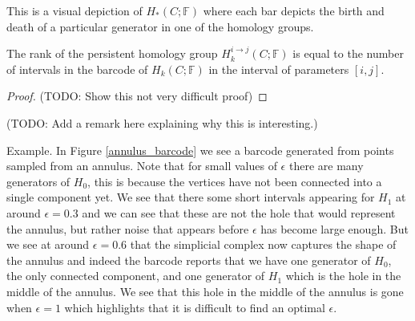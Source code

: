 This is a visual depiction of $H_{*}(C; \mathbb{F})$ where each bar depicts the birth and death of a particular generator in one of the homology groups.

\begin{theorem}
  The rank of the persistent homology group $H^{{i \to j}}_{k}(C;\mathbb{F})$ is equal to the number of intervals in the barcode of $H_{k}(C;\mathbb{F})$ in the interval of parameters $[i,j]$.
  \end{theorem}
  \begin{proof}
  (TODO: Show this not very difficult proof)
  \end{proof}
  (TODO: Add a remark here explaining why this is interesting.)

  Example. In Figure \ref{annulus_barcode} we see a barcode generated from points sampled from an annulus. Note that for small values of $\epsilon$ there are many generators of $H_{0}$, this is because the vertices have not been connected into a single component yet. We see that there some short intervals appearing for $H_{1}$ at around $\epsilon=0.3$ and we can see that these are not the hole that would represent the annulus, but rather noise that appears before $\epsilon$ has become large enough. But we see at around $\epsilon=0.6$ that the simplicial complex now captures the shape of the annulus and indeed the barcode reports that we have one generator of $H_{0}$, the only connected component, and one generator of $H_{1}$ which is the hole in the middle of the annulus. We see that this hole in the middle of the annulus is gone when $\epsilon=1$ which highlights that it is difficult to find an optimal $\epsilon$.

